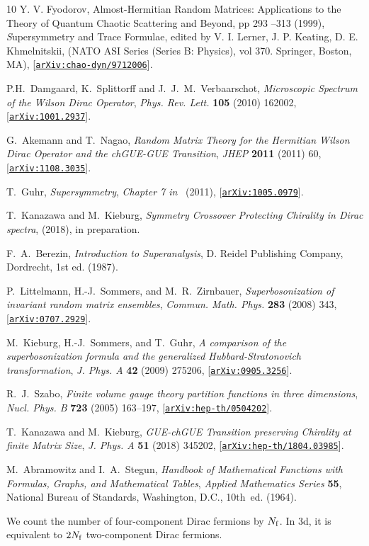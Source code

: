 \documentclass[aps,prl,reprint,graphicx,showpacs]{revtex4-1}
\begin{document}
\begin{thebibliography}{10}
Y. V. Fyodorov,
	Almost-Hermitian Random Matrices: Applications to the Theory of Quantum Chaotic Scattering and Beyond,
	pp 293 –313 (1999),
	{\textit Supersymmetry and Trace Formulae},
	edited by V. I. Lerner, J. P. Keating, D. E. Khmelnitskii,
	(NATO ASI Series (Series B: Physics), vol 370. Springer, Boston, MA),
  [\href{https://arxiv.org/abs/chao-dyn/9712006}{{\tt arXiv:chao-dyn/9712006}}].

P.H.~Damgaard, K.~Splittorff and J.~J.~M.~Verbaarschot, 
{\it {Microscopic Spectrum of the Wilson Dirac Operator}}, {\em Phys. Rev. Lett.} {\bf 105} (2010) 162002, 
[\href{https://arxiv.org/abs/1001.2937}{{\tt arXiv:1001.2937}}].

G.~Akemann and T.~Nagao, {\it {Random Matrix Theory for the Hermitian Wilson Dirac Operator and the chGUE-GUE Transition}},  {\em JHEP} {\bf 2011} (2011) 60,
  [\href{https://arxiv.org/abs/1108.3035}{{\tt arXiv:1108.3035}}].

T.~Guhr, {\it {Supersymmetry}},  {\em Chapter 7 in}~\cite{handbook:2010} (2011),
  [\href{https://arxiv.org/abs/1005.0979}{{\tt arXiv:1005.0979}}].
  
  T.~Kanazawa and M.~Kieburg, {\it {Symmetry Crossover Protecting Chirality in Dirac spectra}},  (2018), in preparation.

F.~A.~Berezin, {\it {Introduction to Superanalysis}}, D. Reidel Publishing Company, Dordrecht, 1st
ed. (1987).

P.~Littelmann, H.-J.~Sommers, and M.~R.~Zirnbauer, {\it {Superbosonization of invariant random matrix ensembles}},  {\em Commun. Math. Phys.} {\bf 283} (2008) 343,
  [\href{https://arxiv.org/abs/0707.2929}{{\tt arXiv:0707.2929}}].

M.~Kieburg, H.-J.~Sommers, and T.~Guhr, {\it {A comparison of the superbosonization formula and the generalized Hubbard-Stratonovich transformation}},  {\em J. Phys. A} {\bf 42} (2009) 275206,
  [\href{https://arxiv.org/abs/0905.3256}{{\tt arXiv:0905.3256}}].
  
R.~J.~Szabo, {\it Finite volume gauge theory partition functions in three dimensions}, {\em Nucl. Phys. B} {\bf 723} (2005) 163--197, 
[\href{https://arxiv.org/abs/hep-th/0504202}{\tt arXiv:hep-th/0504202}].
  
  T.~Kanazawa and M.~Kieburg, {\it {GUE-chGUE Transition preserving Chirality at finite Matrix Size}},  {\em J. Phys. A} {\bf 51} (2018) 345202, 
[\href{https://arxiv.org/abs/1804.03985}{\tt arXiv:hep-th/1804.03985}].

M.~Abramowitz and I.~A.~Stegun, {\em {Handbook of Mathematical Functions with Formulas, Graphs, and Mathematical Tables}}, {\em Applied Mathematics Series} {\bf 55}, National Bureau of Standards, Washington, D.C., 10th~ed. (1964).

We count the number of four-component Dirac fermions by $N_{\rm f}$. In 3d, it is equivalent to $2N_{\rm f}$ two-component Dirac fermions.

\end{thebibliography}
\end{document}
